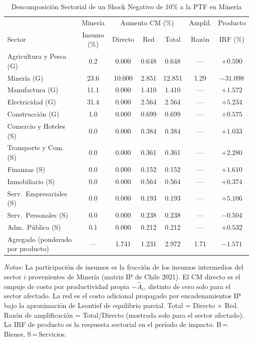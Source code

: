 \begin{table}[htbp]
\centering
\caption{Descomposición Sectorial de un Shock Negativo de 10\% a la PTF en Minería}
\label{tab:min_decomp}
\begin{threeparttable}
\small
\begin{tabular}{@{}l c c c c c c@{}}
\toprule
 & Minería & \multicolumn{3}{c}{Aumento CM (\%)} & Amplif. & Producto \\
\cmidrule(lr){3-5}
Sector & Insumo (\%) & Directo & Red & Total & Razón & IRF (\%) \\
\midrule
Agricultura y Pesca (G) &  0.2 & 0.000 & 0.648 & 0.648 & --- & $+0.590$ \\
Minería (G) & 23.6 & 10.000 & 2.851 & 12.851 &  1.29 & $-31.098$ \\
Manufactura (G) & 11.1 & 0.000 & 1.410 & 1.410 & --- & $+1.572$ \\
Electricidad (G) & 31.4 & 0.000 & 2.564 & 2.564 & --- & $+5.234$ \\
Construcción (G) &  1.0 & 0.000 & 0.699 & 0.699 & --- & $+0.575$ \\
Comercio y Hoteles (S) &  0.0 & 0.000 & 0.384 & 0.384 & --- & $+1.033$ \\
Transporte y Com. (S) &  0.0 & 0.000 & 0.361 & 0.361 & --- & $+2.280$ \\
Finanzas (S) &  0.0 & 0.000 & 0.152 & 0.152 & --- & $+1.610$ \\
Inmobiliario (S) &  0.0 & 0.000 & 0.564 & 0.564 & --- & $+0.374$ \\
Serv.\ Empresariales (S) &  0.0 & 0.000 & 0.193 & 0.193 & --- & $+5.106$ \\
Serv.\ Personales (S) &  0.0 & 0.000 & 0.238 & 0.238 & --- & $-0.504$ \\
Adm.\ Pública (S) &  0.1 & 0.000 & 0.212 & 0.212 & --- & $+0.532$ \\
\midrule
Agregado (ponderado por producto) & --- & 1.741 & 1.231 & 2.972 &  1.71 & $-1.571$ \\
\bottomrule
\end{tabular}
\begin{tablenotes}[flushleft]
\footnotesize
\item \textit{Notas:} La participación de insumos es la fracción de los insumos intermedios del sector $i$ provenientes de Minería (matriz IP de Chile 2021). El CM directo es el empuje de costo por productividad propia $-\hat A_i$, distinto de cero solo para el sector afectado. La red es el costo adicional propagado por encadenamientos IP bajo la aproximación de Leontief de equilibrio parcial. Total = Directo + Red. Razón de amplificación = Total/Directo (mostrada solo para el sector afectado). La IRF de producto es la respuesta sectorial en el período de impacto. B\,=\,Bienes, S\,=\,Servicios.
\end{tablenotes}
\end{threeparttable}
\end{table}
